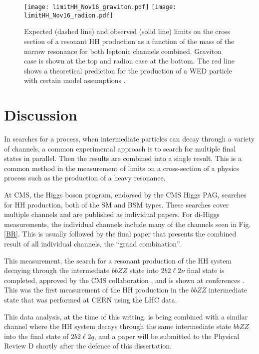 \begin{figure}[H] 
\begin{center}
\texttt{[image: limitHH\_Nov16\_graviton.pdf]}
\texttt{[image: limitHH\_Nov16\_radion.pdf]}
\caption{ Expected (dashed line) and observed (solid line) limits on the cross section of a resonant HH production
as a function of the mass of the narrow resonance for both leptonic channels combined. Graviton case is shown at the top and radion case at the bottom. The red line shows a theoretical prediction for
the production of a WED particle with certain model assumptions \cite{Oliveira:2014kla}.}
\label{fig:HHlimits} 
\end{center}
\end{figure}

\section{Discussion}
\label{sec:Discussion}

In searches for a process, when intermediate particles can decay through a variety of channels, a common experimental approach is to search for multiple final states in parallel. Then the results are combined into a single result. This is a common method in the measurement of limits on a cross-section of a physics process such as the production of a heavy resonance.

At CMS, the Higgs boson program, endorsed by the CMS Higgs PAG, searches for HH production, both of the SM and BSM types. These searches cover multiple channels and are published as individual papers. For di-Higgs measurements, the individual channels include many of the channels seen in Fig. \ref{BR}. This is usually followed by the final paper that presents the combined result of all individual channels, the ``grand combination''.

This measurement, the search for a resonant production of the HH system decaying through the intermediate $bbZZ$ state into $2 b 2 \ell 2 \nu$ final state is completed, approved by the CMS collaboration \cite{CMS-PAS-HIG-17-032}, and is shown at conferences \cite{HiggsCouplings2018}. This was the first measurement of the HH production in the $bbZZ$ intermediate state that was performed at CERN using the LHC data. 

This data analysis, at the time of this writing, is being combined with a similar channel where the HH system decays through the same intermediate state $bbZZ$ into the final state of $2 b 2 \ell 2 q$, and a paper will be submitted to the Physical Review D shortly after the defence of this dissertation.

